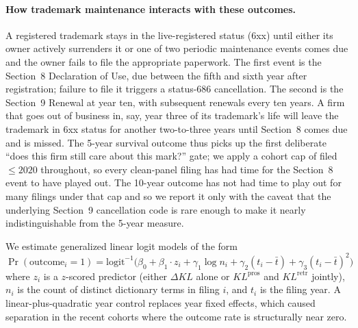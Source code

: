 \documentclass[11pt]{article}
\begin{document}
\paragraph{How trademark maintenance interacts with these outcomes.}
A registered trademark stays in the live-registered status (6xx)
until either its owner actively surrenders it or one of two
periodic maintenance events comes due and the owner fails to file
the appropriate paperwork. The first event is the Section~8
Declaration of Use, due between the fifth and sixth year after
registration; failure to file it triggers a status-686 cancellation.
The second is the Section~9 Renewal at year ten, with subsequent
renewals every ten years. A firm that goes out of business in,
say, year three of its trademark's life will leave the trademark
in 6xx status for another two-to-three years until Section~8 comes
due and is missed. The 5-year survival outcome thus picks up the
first deliberate ``does this firm still care about this mark?''
gate; we apply a cohort cap of filed $\le 2020$ throughout, so
every clean-panel filing has had time for the Section~8 event to
have played out. The 10-year outcome has not had time to play out
for many filings under that cap and so we report it only with the
caveat that the underlying Section~9 cancellation code is rare
enough to make it nearly indistinguishable from the 5-year measure.

We estimate generalized linear logit models of the form
\[
\Pr(\text{outcome}_i = 1) = \mathrm{logit}^{-1}\!\bigl(\beta_0 + \beta_1 \cdot z_i + \gamma_1 \log n_i + \gamma_2 (t_i - \bar t) + \gamma_3 (t_i - \bar t)^2\bigr)
\]
where $z_i$ is a $z$-scored predictor (either $\Delta KL$ alone or
$KL^{\text{pros}}$ and $KL^{\text{retr}}$ jointly), $n_i$ is the count of
distinct dictionary terms in filing $i$, and $t_i$ is the filing year. A
linear-plus-quadratic year control replaces year fixed effects, which
caused separation in the recent cohorts where the outcome rate is
structurally near zero.

\begin{table}[h]
\centering
\caption{Logistic regressions of each survival outcome on $\Delta KL$
(novelty). The first numeric column is the raw logit coefficient on a
$z$-scored $\Delta KL$ (in log-odds units); the second translates that
to a marginal effect on the outcome probability, evaluated at the
sample mean rate, expressed in percentage points per one standard
deviation of $\Delta KL$. Standard errors in parentheses. Industry
sub-headings group the three outcomes per industry.}
\label{tab:survival}

\end{table}
\end{document}
